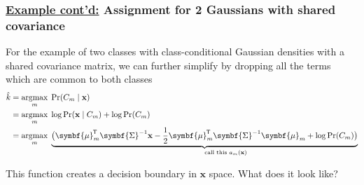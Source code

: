 \documentclass[11pt]{article}
\DeclareMathOperator*{\argmax}{argmax}
\newcommand{\xb}{\mathbf{x}}
\newcommand{\ub}{\symbf{\mu}}
\newcommand{\Sb}{\symbf{\Sigma}}
\newcommand*{\tran}{^{\mkern-1.5mu\mathsf{T}}}
\begin{document}
\begin{framed}
\subsubsection*{\underline{Example cont'd:} Assignment for 2 Gaussians with shared covariance}
For the example of two classes with class-conditional Gaussian densities with a shared covariance matrix, we can further simplify by dropping all the terms which are common
to both classes
\begin{align}
	\hat{k} &= \argmax_m \; \Pr (C_m \mid \xb ) \nonumber \\
	&= \argmax_m \; \log \Pr (\xb \mid C_m) + \log \Pr (C_m) \nonumber  \\
	&= \argmax_m \;  \underbrace{\bigl( \ub_m\tran \Sb^{-1} \xb - \frac{1}{2}\ub_m\tran \Sb^{-1} \ub_m + \log \Pr (C_m) \bigr)}_{\mathrlap{\text{call this $a_m(\xb)$}}}
	\label{eqn:decisionboundary}
\end{align}

This function creates a decision boundary in $\xb$ space. What does it look like?
\end{framed}
\end{document}
